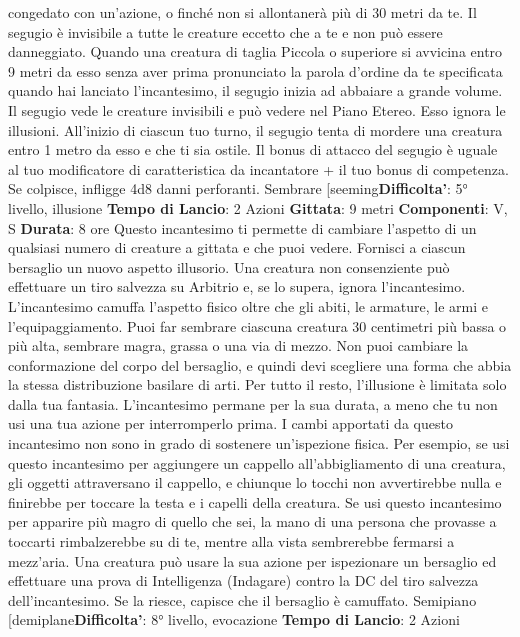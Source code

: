 \begin{multicols}{2}
congedato con un’azione, o finché non si allontanerà
più di 30 metri da te.
Il segugio è invisibile a tutte le creature eccetto che a te
e non può essere danneggiato. Quando una creatura di
taglia Piccola o superiore si avvicina entro 9 metri da
esso senza aver prima pronunciato la parola d’ordine
da te specificata quando hai lanciato l’incantesimo, il
segugio inizia ad abbaiare a grande volume. Il segugio
vede le creature invisibili e può vedere nel Piano
Etereo. Esso ignora le illusioni.
All’inizio di ciascun tuo turno, il segugio tenta di
mordere una creatura entro 1 metro da esso e che ti
sia ostile. Il bonus di attacco del segugio è uguale al tuo
modificatore di caratteristica da incantatore + il tuo
bonus di competenza. Se colpisce, infligge 4d8 danni
perforanti.
Sembrare
[seeming\textbf{Difficolta'}:
5° livello, illusione
\textbf{Tempo di Lancio}: 2 Azioni
\textbf{Gittata}: 9 metri
\textbf{Componenti}: V, S
\textbf{Durata}: 8 ore
Questo incantesimo ti permette di cambiare l’aspetto di
un qualsiasi numero di creature a gittata e che puoi
vedere. Fornisci a ciascun bersaglio un nuovo aspetto
illusorio. Una creatura non consenziente può effettuare
un tiro salvezza su Arbitrio e, se lo supera, ignora
l’incantesimo.
L’incantesimo camuffa l’aspetto fisico oltre che gli abiti,
le armature, le armi e l’equipaggiamento. Puoi far
sembrare ciascuna creatura 30 centimetri più bassa o
più alta, sembrare magra, grassa o una via di mezzo.
Non puoi cambiare la conformazione del corpo del
bersaglio, e quindi devi scegliere una forma che abbia
la stessa distribuzione basilare di arti. Per tutto il resto,
l’illusione è limitata solo dalla tua fantasia.
L’incantesimo permane per la sua durata, a meno che
tu non usi una tua azione per interromperlo prima.
I cambi apportati da questo incantesimo non sono in
grado di sostenere un’ispezione fisica. Per esempio, se
usi questo incantesimo per aggiungere un cappello
all’abbigliamento di una creatura, gli oggetti
attraversano il cappello, e chiunque lo tocchi non
avvertirebbe nulla e finirebbe per toccare la testa e i
capelli della creatura. Se usi questo incantesimo per
apparire più magro di quello che sei, la mano di una
persona che provasse a toccarti rimbalzerebbe su di te,
mentre alla vista sembrerebbe fermarsi a mezz’aria.
Una creatura può usare la sua azione per ispezionare
un bersaglio ed effettuare una prova di Intelligenza
(Indagare) contro la DC del tiro salvezza 
dell’incantesimo. Se la riesce, capisce che il bersaglio è
camuffato.
Semipiano
[demiplane\textbf{Difficolta'}:
8° livello, evocazione
\textbf{Tempo di Lancio}: 2 Azioni

\end{multicols}
